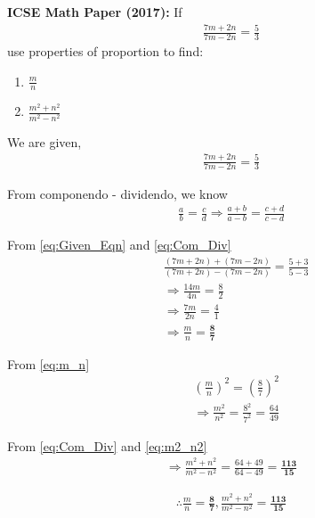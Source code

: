 \documentclass[journal,12pt,twocolumn]{IEEEtran}
\begin{document}
\begin{problem}[6.c]
\textbf{ICSE Math Paper (2017):}
             If \begin{align}
                \frac{7m + 2n}{7m - 2n} = \frac{5}{3}
             \end{align}use properties of proportion to find:
             \begin{enumerate}[label=(\roman{enumi})]
             \item $\frac{m}{n}$
             \item $\frac{m^2 + n^2}{m^2 - n^2}$
\end{enumerate}
\end{problem}

\solution

We are given,
\begin{align}
        \frac{7m + 2n}{7m - 2n} = \frac{5}{3}
        \label{eq:Given_Eqn}
\end{align}

From componendo - dividendo, we know
\begin{align}
        \frac{a}{b} = \frac{c}{d} \Rightarrow \frac{a+b}{a-b} = \frac{c+d}{c-d}
        \label{eq:Com_Div}
\end{align}

From
        \eqref{eq:Given_Eqn}
and
        \eqref{eq:Com_Div}
\begin{align}
        &\frac{(7m + 2n) + (7m - 2n)}{(7m + 2n) - (7m - 2n)} = \frac{5 + 3}{5 - 3}
        \\
        &\Rightarrow \frac{14m}{4n} = \frac{8}{2}
        \\
        &\Rightarrow \frac{7m}{2n} = \frac{4}{1}
        \\
        &\Rightarrow \frac{m}{n} = \frac{\textbf{8}}{\textbf{7}}
        \label{eq:m_n}
\end{align}

From
        \eqref{eq:m_n}
\begin{align}
        &\left(\frac{m}{n}\right)^2 = \left(\frac{8}{7}\right)^2
        \\
        &\Rightarrow \frac{m^2}{n^2} = \frac{8^2}{7^2} = \frac{64}{49}
        \label{eq:m2_n2}
\end{align}

From
        \eqref{eq:Com_Div}
and
        \eqref{eq:m2_n2}
\begin{align}
        \Rightarrow \frac{m^2 + n^2}{m^2 - n^2} = \frac{64 + 49}{64 - 49} = \frac{\textbf{113}}{\textbf{15}}
\end{align}

\begin{align}
        \therefore \frac{m}{n} = \frac{\textbf{8}}{\textbf{7}}, \frac{m^2+n^2}{m^2-n^2} = \frac{\textbf{113}}{\textbf{15}}
\end{align}
\end{document}
